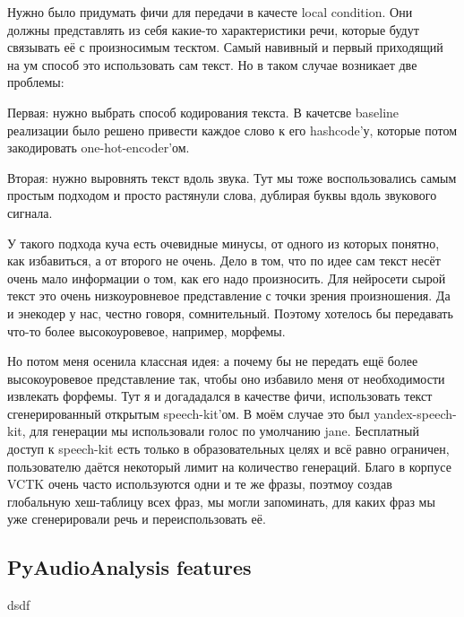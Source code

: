 \documentclass[../diploma.tex]{subfiles}
\begin{document}
 
Нужно было придумать фичи для передачи в качесте local condition. Они должны представлять из себя какие-то характеристики речи, которые будут связывать её с произносимым тесктом. Самый навивный и первый приходящий на ум способ это использовать сам текст. Но в таком случае возникает две проблемы:

Первая: нужно выбрать способ кодирования текста. В качетсве baseline реализации было решено привести каждое слово к его hashcode'у, которые потом закодировать one-hot-encoder'ом. 

Вторая: нужно выровнять текст вдоль звука. Тут мы тоже воспользовались самым простым подходом и просто растянули слова, дублирая буквы вдоль звукового сигнала.

У такого подхода куча есть очевидные минусы, от одного из которых понятно, как избавиться, а от второго не очень. Дело в том, что по идее сам текст несёт очень мало информации о том, как его надо произносить. Для нейросети сырой текст это очень низкоуровневое представление с точки зрения произношения. Да и энекодер у нас, честно говоря, сомнительный. Поэтому хотелось бы передавать что-то более высокоуровевое, например, морфемы. 

Но потом меня осенила классная идея: а почему бы не передать ещё более высокоуровевое представление так, чтобы оно избавило меня от необходимости извлекать форфемы. Тут я и догададался в качестве фичи, использовать текст сгенерированный открытым speech-kit'ом. В моём случае это был yandex-speech-kit, для генерации мы использовали голос по умолчанию jane. Бесплатный доступ к speech-kit есть только в образовательных целях и всё равно ограничен, пользователю даётся некоторый лимит на количество генераций. Благо в корпусе VCTK очень часто используются одни и те же фразы, поэтмоу создав глобальную хеш-таблицу всех фраз, мы могли запоминать, для каких фраз мы уже сгенерировали речь и переиспользовать её.

\subsection{PyAudioAnalysis features}
    dsdf

\end{document}
